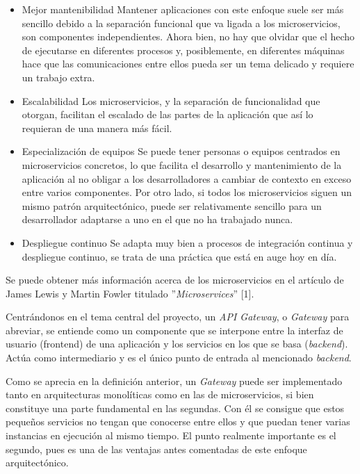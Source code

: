 \documentclass[11pt,spanish,listoffigures]{tfgetsinf}
\begin{document}
\begin{itemize}
	\item Mejor mantenibilidad
Mantener aplicaciones con este enfoque suele ser más sencillo debido a la separación funcional que va ligada a los microservicios, son componentes independientes. Ahora bien, no hay que olvidar que el hecho de ejecutarse en diferentes procesos y, posiblemente, en diferentes máquinas hace que las comunicaciones entre ellos pueda ser un tema delicado y requiere un trabajo extra.

	\item Escalabilidad
Los microservicios, y la separación de funcionalidad que otorgan, facilitan el escalado de las partes de la aplicación que así lo requieran de una manera más fácil.

	\item Especialización de equipos
Se puede tener personas o equipos centrados en microservicios concretos, lo que facilita el desarrollo y mantenimiento de la aplicación al no obligar a los desarrolladores a cambiar de contexto en exceso entre varios componentes. Por otro lado, si todos los microservicios siguen un mismo patrón arquitectónico, puede ser relativamente sencillo para un desarrollador adaptarse a uno en el que no ha trabajado nunca.

	\item Despliegue continuo
Se adapta muy bien a procesos de integración continua y despliegue continuo, se trata de una práctica que está en auge hoy en día.

\end{itemize}

Se puede obtener más información acerca de los microservicios en el artículo de James Lewis y Martin Fowler titulado ''\emph{Microservices}'' [1].

Centrándonos en el tema central del proyecto, un \emph{API Gateway}, o \emph{Gateway} para abreviar, se entiende como un componente que se interpone entre la interfaz de usuario (frontend) de una aplicación y los servicios en los que se basa (\emph{backend}). Actúa como intermediario y es el único punto de entrada al mencionado \emph{backend}.

Como se aprecia en la definición anterior, un \emph{Gateway} puede ser implementado tanto en arquitecturas monolíticas como en las de microservicios, si bien constituye una parte fundamental en las segundas. Con él se consigue que estos pequeños servicios no tengan que conocerse entre ellos y que puedan tener varias instancias en ejecución al mismo tiempo. El punto realmente importante es el segundo, pues es una de las ventajas antes comentadas de este enfoque arquitectónico.
\end{document}
